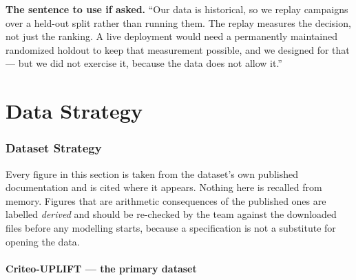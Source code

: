 \documentclass[11pt,a4paper]{article}
\begin{document}
\begin{alertbox}
\textbf{The sentence to use if asked.} ``Our data is historical, so we replay campaigns over a
held-out split rather than running them. The replay measures the decision, not just the ranking. A
live deployment would need a permanently maintained randomized holdout to keep that measurement
possible, and we designed for that --- but we did not exercise it, because the data does not allow
it.''
\end{alertbox}


\part{Data Strategy}

\section{Dataset Strategy}
\label{sec:datasets}

\begin{keybox}
Every figure in this section is taken from the dataset's own published documentation and is cited
where it appears. Nothing here is recalled from memory. Figures that are arithmetic consequences of
the published ones are labelled \emph{derived} and should be re-checked by the team against the
downloaded files before any modelling starts, because a specification is not a substitute for opening the data.
\end{keybox}

\subsection{Criteo-UPLIFT --- the primary dataset}
\end{document}
